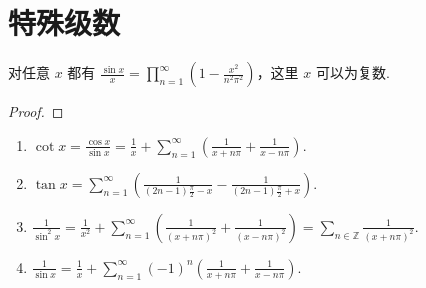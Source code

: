 \documentclass[../../main.tex]{subfiles}
\begin{document}
\section{特殊级数}

\begin{proposition}\label{proposition:sinx/x因式分解}
对任意 $x$ 都有 $\frac{\sin x}{x} = \prod_{n=1}^{\infty} \left(1 - \frac{x^2}{n^2\pi^2}\right)$，这里 $x$ 可以为复数.
\end{proposition}
\begin{proof}

\end{proof}

\begin{proposition}\label{proposition:三角函数的特殊级数表示}
\begin{enumerate}
\item $\cot x = \frac{\cos x}{\sin x} = \frac{1}{x} + \sum_{n=1}^{\infty} \left( \frac{1}{x + n\pi} + \frac{1}{x - n\pi} \right).$

\item $\tan x = \sum_{n=1}^{\infty} \left( \frac{1}{(2n - 1)\frac{\pi}{2} - x} - \frac{1}{(2n - 1)\frac{\pi}{2} + x} \right) .$

\item $\frac{1}{\sin^2 x} = \frac{1}{x^2} + \sum_{n=1}^{\infty} \left( \frac{1}{(x + n\pi)^2} + \frac{1}{(x - n\pi)^2} \right) = \sum_{n \in \mathbb{Z}} \frac{1}{(x + n\pi)^2}.$

\item $\frac{1}{\sin x} = \frac{1}{x} + \sum_{n=1}^{\infty} (-1)^n \left( \frac{1}{x + n\pi} + \frac{1}{x - n\pi} \right).$
\end{enumerate}
\end{proposition}
\end{document}
